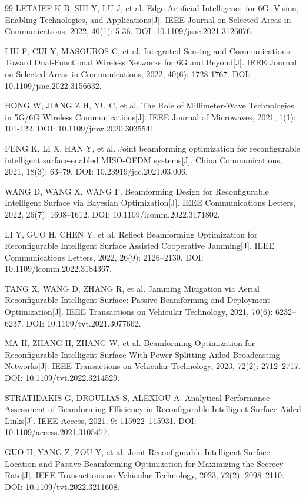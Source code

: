\begin{thebibliography}{99}
LETAIEF K B, SHI Y, LU J, et al. Edge Artificial Intelligence for 6G: Vision, Enabling Technologies, and Applications[J]. IEEE Journal on Selected Areas in Communications, 2022, 40(1): 5-36. DOI: 10.1109/jsac.2021.3126076.

LIU F, CUI Y, MASOUROS C, et al. Integrated Sensing and Communications: Toward Dual-Functional Wireless Networks for 6G and Beyond[J]. IEEE Journal on Selected Areas in Communications, 2022, 40(6): 1728-1767. DOI: 10.1109/jsac.2022.3156632.

HONG W, JIANG Z H, YU C, et al. The Role of Millimeter-Wave Technologies in 5G/6G Wireless Communications[J]. IEEE Journal of Microwaves, 2021, 1(1): 101-122. DOI: 10.1109/jmw.2020.3035541.

 FENG K, LI X, HAN Y, et al. Joint beamforming optimization for reconfigurable intelligent surface-enabled MISO-OFDM systems[J]. China Communications, 2021, 18(3): 63--79. DOI: 10.23919/jcc.2021.03.006.

 WANG D, WANG X, WANG F. Beamforming Design for Reconfigurable Intelligent Surface via Bayesian Optimization[J]. IEEE Communications Letters, 2022, 26(7): 1608--1612. DOI: 10.1109/lcomm.2022.3171802.

 LI Y, GUO H, CHEN Y, et al. Reflect Beamforming Optimization for Reconfigurable Intelligent Surface Assisted Cooperative Jamming[J]. IEEE Communications Letters, 2022, 26(9): 2126--2130. DOI: 10.1109/lcomm.2022.3184367.

 TANG X, WANG D, ZHANG R, et al. Jamming Mitigation via Aerial Reconfigurable Intelligent Surface: Passive Beamforming and Deployment Optimization[J]. IEEE Transactions on Vehicular Technology, 2021, 70(6): 6232--6237. DOI: 10.1109/tvt.2021.3077662.

 MA H, ZHANG H, ZHANG W, et al. Beamforming Optimization for Reconfigurable Intelligent Surface With Power Splitting Aided Broadcasting Networks[J]. IEEE Transactions on Vehicular Technology, 2023, 72(2): 2712--2717. DOI: 10.1109/tvt.2022.3214529.

 STRATIDAKIS G, DROULIAS S, ALEXIOU A. Analytical Performance Assessment of Beamforming Efficiency in Reconfigurable Intelligent Surface-Aided Links[J]. IEEE Access, 2021, 9: 115922--115931. DOI: 10.1109/access.2021.3105477.

 GUO H, YANG Z, ZOU Y, et al. Joint Reconfigurable Intelligent Surface Location and Passive Beamforming Optimization for Maximizing the Secrecy-Rate[J]. IEEE Transactions on Vehicular Technology, 2023, 72(2): 2098--2110. DOI: 10.1109/tvt.2022.3211608.


\end{thebibliography}
